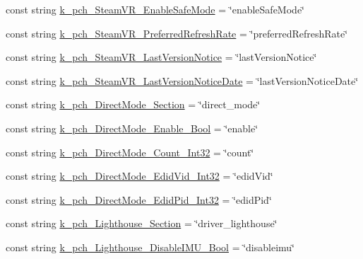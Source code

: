 \begin{DoxyCompactItemize}
\item 
const string \mbox{\hyperlink{class_valve_1_1_v_r_1_1_open_v_r_a09f20ae0993105a35d71ce3ae9feb37e}{k\+\_\+pch\+\_\+\+Steam\+V\+R\+\_\+\+Enable\+Safe\+Mode}} = \char`\"{}enable\+Safe\+Mode\char`\"{}
\item 
const string \mbox{\hyperlink{class_valve_1_1_v_r_1_1_open_v_r_a977b48a0d6f93af13021dbcf64c99dfa}{k\+\_\+pch\+\_\+\+Steam\+V\+R\+\_\+\+Preferred\+Refresh\+Rate}} = \char`\"{}preferred\+Refresh\+Rate\char`\"{}
\item 
const string \mbox{\hyperlink{class_valve_1_1_v_r_1_1_open_v_r_ac0c090e419ea8cb3f82f206fef60deda}{k\+\_\+pch\+\_\+\+Steam\+V\+R\+\_\+\+Last\+Version\+Notice}} = \char`\"{}last\+Version\+Notice\char`\"{}
\item 
const string \mbox{\hyperlink{class_valve_1_1_v_r_1_1_open_v_r_a6b9ad4d7b7c5c5ce6e80d1715471466e}{k\+\_\+pch\+\_\+\+Steam\+V\+R\+\_\+\+Last\+Version\+Notice\+Date}} = \char`\"{}last\+Version\+Notice\+Date\char`\"{}
\item 
const string \mbox{\hyperlink{class_valve_1_1_v_r_1_1_open_v_r_ac5bc1deac908d4ba70e7edcc9b078b5d}{k\+\_\+pch\+\_\+\+Direct\+Mode\+\_\+\+Section}} = \char`\"{}direct\+\_\+mode\char`\"{}
\item 
const string \mbox{\hyperlink{class_valve_1_1_v_r_1_1_open_v_r_a8a9ed8490725151fecf85ad8de311723}{k\+\_\+pch\+\_\+\+Direct\+Mode\+\_\+\+Enable\+\_\+\+Bool}} = \char`\"{}enable\char`\"{}
\item 
const string \mbox{\hyperlink{class_valve_1_1_v_r_1_1_open_v_r_a9eca78b64cb806b65d175602858632b5}{k\+\_\+pch\+\_\+\+Direct\+Mode\+\_\+\+Count\+\_\+\+Int32}} = \char`\"{}count\char`\"{}
\item 
const string \mbox{\hyperlink{class_valve_1_1_v_r_1_1_open_v_r_a6ef908e1d732decb74615792603bc9d4}{k\+\_\+pch\+\_\+\+Direct\+Mode\+\_\+\+Edid\+Vid\+\_\+\+Int32}} = \char`\"{}edid\+Vid\char`\"{}
\item 
const string \mbox{\hyperlink{class_valve_1_1_v_r_1_1_open_v_r_aa23b49afc571d1f291d295c3a27a9387}{k\+\_\+pch\+\_\+\+Direct\+Mode\+\_\+\+Edid\+Pid\+\_\+\+Int32}} = \char`\"{}edid\+Pid\char`\"{}
\item 
const string \mbox{\hyperlink{class_valve_1_1_v_r_1_1_open_v_r_a529da3ed5ec61d0c4c9bb1fc6860412d}{k\+\_\+pch\+\_\+\+Lighthouse\+\_\+\+Section}} = \char`\"{}driver\+\_\+lighthouse\char`\"{}
\item 
const string \mbox{\hyperlink{class_valve_1_1_v_r_1_1_open_v_r_a73703b1b4963bac72e30153a68b7e56c}{k\+\_\+pch\+\_\+\+Lighthouse\+\_\+\+Disable\+I\+M\+U\+\_\+\+Bool}} = \char`\"{}disableimu\char`\"{}

\end{DoxyCompactItemize}
